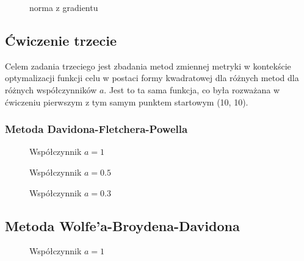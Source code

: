 \documentclass[a4paper, 10pt]{article}
\begin{document}
				\begin{figure}[H]
				   	\centering
				   	\def \svgwidth{0.75\columnwidth}
				   	
				   	\caption{norma z gradientu}
				\end{figure}\noindent
			    

		\subsection{Ćwiczenie trzecie}
			Celem zadania trzeciego jest zbadania metod zmiennej metryki w kontekście optymalizacji funkcji celu w postaci formy kwadratowej dla różnych metod dla różnych współczynników $a$. Jest to ta sama funkcja, co była rozważana w ćwiczeniu pierwszym z tym samym punktem startowym (10, 10).
			\subsubsection{Metoda Davidona-Fletchera-Powella}
			    \begin{figure}[H]
			        \centering
			        \def \svgwidth{0.75\columnwidth}
			        
			        \caption{Współczynnik $a = 1$}
			    \end{figure}\noindent
			
			
			    \begin{figure}[H]
			        \centering
			        \def \svgwidth{0.75\columnwidth}
			        
			        \caption{Współczynnik $a = 0.5$}
			    \end{figure}\noindent
			
			
			    \begin{figure}[H]
			        \centering
			        \def \svgwidth{0.75\columnwidth}
			        
			        \caption{Współczynnik $a = 0.3$}
			    \end{figure}\noindent
		
			\subsection{Metoda Wolfe'a-Broydena-Davidona}
			    \begin{figure}[H]
			        \centering
			        \def \svgwidth{0.75\columnwidth}
			        
			        \caption{Współczynnik $a=1$}
			    \end{figure}\noindent
			
\end{document}
